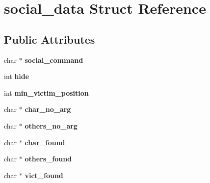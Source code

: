 \hypertarget{structsocial__data}{\section{social\-\_\-data Struct Reference}
\label{structsocial__data}
}
\subsection*{Public Attributes}
\begin{DoxyCompactItemize}
\item 
\hypertarget{structsocial__data_aa2e08ab3910f10ca9e8bae5229a39a43}{char $\ast$ {\bfseries social\-\_\-command}}\label{structsocial__data_aa2e08ab3910f10ca9e8bae5229a39a43}

\item 
\hypertarget{structsocial__data_a955ff9a01fe8536aa9e7aac0e27f9efe}{int {\bfseries hide}}\label{structsocial__data_a955ff9a01fe8536aa9e7aac0e27f9efe}

\item 
\hypertarget{structsocial__data_abc850bea2b43c9a09bb9a7bffbb7b13a}{int {\bfseries min\-\_\-victim\-\_\-position}}\label{structsocial__data_abc850bea2b43c9a09bb9a7bffbb7b13a}

\item 
\hypertarget{structsocial__data_a42c237da0a34db1dc19078721d0f5dc5}{char $\ast$ {\bfseries char\-\_\-no\-\_\-arg}}\label{structsocial__data_a42c237da0a34db1dc19078721d0f5dc5}

\item 
\hypertarget{structsocial__data_a361811d70b7309e8c3ee782688a06ce6}{char $\ast$ {\bfseries others\-\_\-no\-\_\-arg}}\label{structsocial__data_a361811d70b7309e8c3ee782688a06ce6}

\item 
\hypertarget{structsocial__data_a0cc1c488655ea7258d2cd238f7b89013}{char $\ast$ {\bfseries char\-\_\-found}}\label{structsocial__data_a0cc1c488655ea7258d2cd238f7b89013}

\item 
\hypertarget{structsocial__data_a2cc7800d9ac6d3e466c04811ef63c226}{char $\ast$ {\bfseries others\-\_\-found}}\label{structsocial__data_a2cc7800d9ac6d3e466c04811ef63c226}

\item 
\hypertarget{structsocial__data_a9a6909611ff90a480d9022a1213836d8}{char $\ast$ {\bfseries vict\-\_\-found}}\label{structsocial__data_a9a6909611ff90a480d9022a1213836d8}


\end{DoxyCompactItemize}
